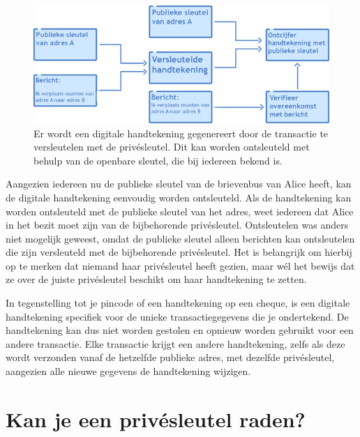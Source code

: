 \documentclass[
  letterpaper,
]{scrbook}
\begin{document}
\begin{figure}

{\centering \includegraphics{./images/fig13.png}

}

\caption{\label{fig-figuur13}Er wordt een digitale handtekening
gegenereert door de transactie te versleutelen met de privésleutel. Dit
kan worden ontsleuteld met behulp van de openbare sleutel, die bij
iedereen bekend is.}

\end{figure}

Aangezien iedereen nu de publieke sleutel van de brievenbus van Alice
heeft, kan de digitale handtekening eenvoudig worden ontsleuteld. Als de
handtekening kan worden ontsleuteld met de publieke sleutel van het
adres, weet iedereen dat Alice in het bezit moet zijn van de
bijbehorende privésleutel. Ontsleutelen was anders niet mogelijk
geweest, omdat de publieke sleutel alleen berichten kan ontsleutelen die
zijn versleuteld met de bijbehorende privésleutel. Het is belangrijk om
hierbij op te merken dat niemand haar privésleutel heeft gezien, maar
wél het bewijs dat ze over de juiste privésleutel beschikt om haar
handtekening te zetten.

In tegenstelling tot je pincode of een handtekening op een cheque, is
een digitale handtekening specifiek voor de unieke transactiegegevens
die je ondertekend. De handtekening kan dus niet worden gestolen en
opnieuw worden gebruikt voor een andere transactie. Elke transactie
krijgt een andere handtekening, zelfs als deze wordt verzonden vanaf de
hetzelfde publieke adres, met dezelfde privésleutel, aangezien alle
nieuwe gegevens de handtekening wijzigen.

\hypertarget{kan-je-een-privuxe9sleutel-raden}{%
\section{Kan je een privésleutel
raden?}\label{kan-je-een-privuxe9sleutel-raden}}
\end{document}
